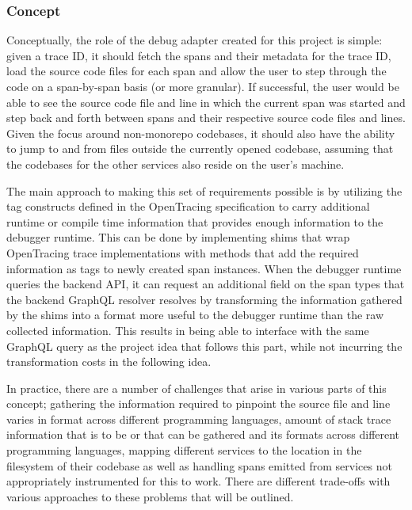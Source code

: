 \documentclass[12pt,pdftex,titlepage]{report}
\begin{document}
                \subsubsection{Concept}
                    Conceptually, the role of the debug adapter created for this project is simple: given a trace ID, it should fetch the spans and their metadata for the trace ID, load the 
                    source code files for each span and allow the user to step through the code on a span-by-span basis (or more granular). If successful, the user would be able to see the
                    source code file and line in which the current span was started and step back and forth between spans and their respective source code files and lines. Given the focus
                    around non-monorepo codebases, it should also have the ability to jump to and from files outside the currently opened codebase, assuming that the codebases for the other 
                    services also reside on the user's machine.
                    
                    The main approach to making this set of requirements possible is by utilizing the tag constructs defined in the OpenTracing specification to carry additional runtime or
                    compile time information that provides enough information to the debugger runtime. This can be done by implementing shims that wrap OpenTracing trace implementations with
                    methods that add the required information as tags to newly created span instances. When the debugger runtime queries the backend API, it can request an additional field on
                    the span types that the backend GraphQL resolver resolves by transforming the information gathered by the shims into a format more useful to the debugger runtime than the
                    raw collected information. This results in being able to interface with the same GraphQL query as the project idea that follows this part, while not incurring the 
                    transformation costs in the following idea.

                    In practice, there are a number of challenges that arise in various parts of this concept; gathering the information required to pinpoint the source file and line varies 
                    in format across different programming languages, amount of stack trace information that is to be or that can be gathered and its formats across different programming 
                    languages, mapping different services to the location in the filesystem of their codebase as well as handling spans emitted from services not appropriately instrumented 
                    for this to work. There are different trade-offs with various approaches to these problems that will be outlined.
\end{document}
